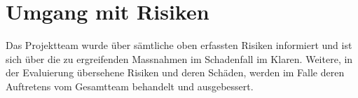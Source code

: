 \clearpage	

\section{Umgang mit Risiken}
Das Projektteam wurde über sämtliche oben erfassten Risiken informiert und ist sich über die zu ergreifenden Massnahmen im Schadenfall im Klaren.
Weitere, in der Evaluierung übersehene Risiken und deren Schäden, werden im Falle deren Auftretens vom Gesamtteam behandelt und ausgebessert.
